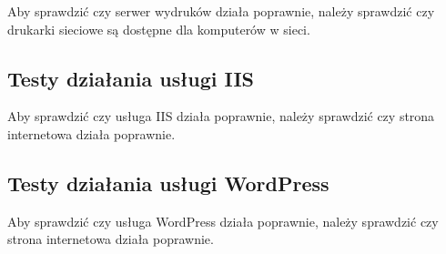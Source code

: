 Aby sprawdzić czy serwer wydruków działa poprawnie, należy sprawdzić czy drukarki sieciowe są dostępne dla komputerów w sieci.



\clearpage

\subsection{Testy działania usługi IIS}

Aby sprawdzić czy usługa IIS działa poprawnie, należy sprawdzić czy strona internetowa działa poprawnie.

\clearpage

\subsection{Testy działania usługi WordPress}


Aby sprawdzić czy usługa WordPress działa poprawnie, należy sprawdzić czy strona internetowa działa poprawnie.




